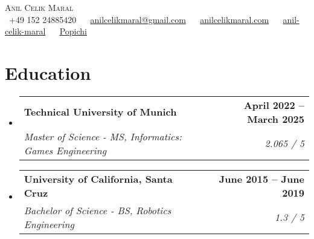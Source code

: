 \documentclass[letterpaper,11pt]{article}
\makeatletter
\newcommand{\resumeSubheading}[4]{
  \vspace{-2pt}\item
    \begin{tabular*}{1.0\textwidth}[t]{l@{\extracolsep{\fill}}r}
      \textbf{#1} & \textbf{\small #2} \\
      \textit{\small#3} & \textit{\small #4} \\
    \end{tabular*}\vspace{-7pt}
}
\newcommand{\resumeSubHeadingListStart}{\begin{itemize}[leftmargin=0.0in, label={}]}
\newcommand{\resumeSubHeadingListEnd}{\end{itemize}}
\makeatother
\begin{document}

\begin{center}
    {\Huge \scshape Anil Celik Maral} \\ \vspace{1pt}
    \vspace{1pt}
    \small \raisebox{-0.1\height}\faPhone\ +49 152 24885420 ~ {\raisebox{-0.2\height}\faEnvelope\  \underline{anilcelikmaral@gmail.com}} ~ 
    {\raisebox{-0.2\height}\faGlobe\ \underline{anilcelikmaral.com}}  ~
    {\raisebox{-0.2\height}\faLinkedin\ \underline{anil-celik-maral}}  ~
    {\raisebox{-0.2\height}\faGithub\ \underline{Popichi}}
    \vspace{-10pt}  
    
\end{center}


\section{Education}
  \resumeSubHeadingListStart
    \resumeSubheading
      {Technical University of Munich}{April 2022 -- March 2025}
      {Master of Science - MS, Informatics: Games Engineering}{2.065 / 5}
      \resumeSubheading
      {University of California, Santa Cruz}{June 2015 -- June 2019}
      {Bachelor of Science - BS, Robotics Engineering}{1.3 / 5}

  \resumeSubHeadingListEnd

       
\end{document}

